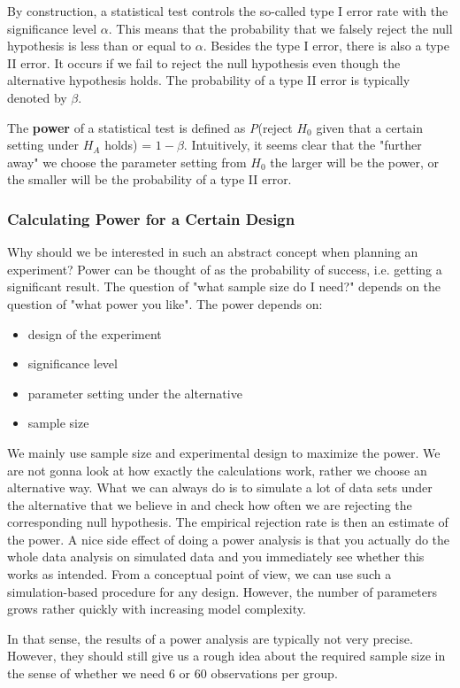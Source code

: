 By construction, a statistical test controls the so-called type I error rate with the significance level $\alpha$. This means that the probability that we falsely reject the null hypothesis is less than or equal to $\alpha$. Besides the type I error, there is also a type II error. It occurs if we fail to reject the null hypothesis even though the alternative hypothesis holds. The probability of a type II error is typically denoted by $\beta$. \medskip

The \textbf{power} of a statistical test is defined as \textit{P}(reject $H_0$ given that a certain setting under $H_A$ holds) = $1 - \beta$. Intuitively, it seems clear that the "further away" we choose the parameter setting from $H_0$ the larger will be the power, or the smaller will be the probability of a type II error.

\subsubsection{Calculating Power for a Certain Design}

Why should we be interested in such an abstract concept when planning an experiment? Power can be thought of as the probability of success, i.e. getting a significant result. The question of "what sample size do I need?" depends on the question of "what power you like". The power depends on:
\begin{itemize}
	\item design of the experiment
	\item significance level
	\item parameter setting under the alternative
	\item sample size
\end{itemize}

We mainly use sample size and experimental design to maximize the power. We are not gonna look at how exactly the calculations work, rather we choose an alternative way. What we can always do is to simulate a lot of data sets under the alternative that we believe in and check how often we are rejecting the corresponding null hypothesis. The empirical rejection rate is then an estimate of the power. A nice side effect of doing a power analysis is that you actually do the whole data analysis on simulated data and you immediately see whether this works as intended. From a conceptual point of view, we can use such a simulation-based procedure for any design. However, the number of parameters grows rather quickly with increasing model complexity. \medskip

In that sense, the results of a power analysis are typically not very precise. However, they should still give us a rough idea about the required sample size in the sense of whether we need 6 or 60 observations per group.
